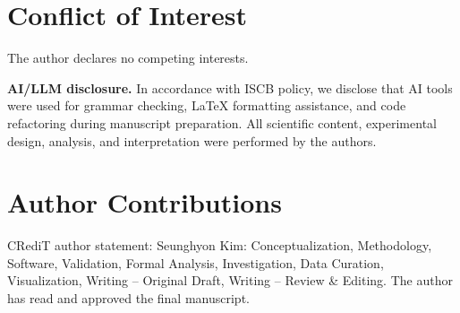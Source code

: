 \documentclass[namedate,contemporary,mediumone]{oup-authoring-template}
\begin{document}
\section*{Conflict of Interest}
The author declares no competing interests.

\noindent\textbf{AI/LLM disclosure.}
In accordance with ISCB policy, we disclose that AI tools were used for grammar
checking, LaTeX formatting assistance, and code refactoring during manuscript
preparation. All scientific content, experimental design, analysis, and
interpretation were performed by the authors.

\section*{Author Contributions}
CRediT author statement: Seunghyon Kim: Conceptualization, Methodology,
Software, Validation, Formal Analysis, Investigation, Data Curation,
Visualization, Writing -- Original Draft, Writing -- Review \& Editing.
The author has read and approved the final manuscript.



\end{document}
